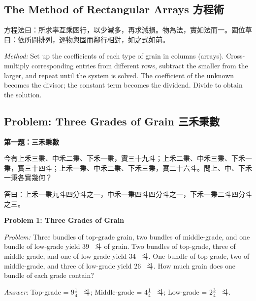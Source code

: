 \documentclass[11pt,a4paper]{article}
\newcommand{\zh}[1]{{\CJKfamily{\CJKrmdefault} #1}}
\newenvironment{chside}{%
  \begin{minipage}[t]{0.48\textwidth}%
  \setlength{\parindent}{1.5em}%
  \linespread{1.25}\selectfont%
  \small%
}{%
  \end{minipage}%
}
\newenvironment{enside}{%
  \hfill\begin{minipage}[t]{0.48\textwidth}%
  \setlength{\parindent}{1em}%
  \linespread{1.15}\selectfont%
  \small%
}{%
  \end{minipage}%
}
\begin{document}
\subsection{The Method of Rectangular Arrays \zh{方程術}}

\noindent\begin{chside}
\zh{方程法曰：所求率互乘困行，以少減多，再求減損。物為法，實如法而一。固位草曰：依所問排列，逐物與固而鄰行相對，如之式如前。}
\end{chside}%
\begin{enside}
\textit{Method:} Set up the coefficients of each type of grain in columns
(arrays). Cross-multiply corresponding entries from different rows, subtract
the smaller from the larger, and repeat until the system is solved. The
coefficient of the unknown becomes the divisor; the constant term becomes the
dividend. Divide to obtain the solution.
\end{enside}

\subsection{Problem: Three Grades of Grain \zh{三禾秉數}}

\noindent\begin{chside}
\noindent\textbf{第一題：三禾秉數}

\zh{今有上禾三秉、中禾二秉、下禾一秉，實三十九斗；上禾二秉、中禾三秉、下禾一秉，實三十四斗；上禾一秉、中禾二秉、下禾三秉，實二十六斗。問上、中、下禾一秉各實幾何？}

\medskip
\zh{答曰：上禾一秉九斗四分斗之一，中禾一秉四斗四分斗之一，下禾一秉二斗四分斗之三。}
\end{chside}%
\begin{enside}
\noindent\textbf{Problem 1: Three Grades of Grain}

\textit{Problem:} Three bundles of top-grade grain, two bundles of
middle-grade, and one bundle of low-grade yield 39~\zh{斗} of grain. Two
bundles of top-grade, three of middle-grade, and one of low-grade yield 34~\zh{斗}. One bundle of top-grade, two of middle-grade, and three of
low-grade yield 26~\zh{斗}. How much grain does one bundle of each grade
contain?

\medskip
\textit{Answer:} Top-grade = $9\frac{1}{4}$~\zh{斗}; Middle-grade =
$4\frac{1}{4}$~\zh{斗}; Low-grade = $2\frac{3}{4}$~\zh{斗}.
\end{enside}
\end{document}
